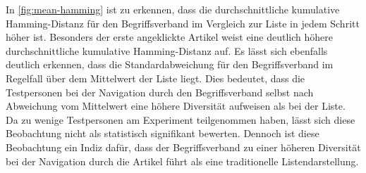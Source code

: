 In \autoref{fig:mean-hamming} ist zu erkennen, dass die durchschnittliche kumulative Hamming-Distanz für den Begriffsverband im Vergleich zur Liste in jedem Schritt höher ist.
Besonders der erste angeklickte Artikel weist eine deutlich höhere durchschnittliche kumulative Hamming-Distanz auf.
Es lässt sich ebenfalls deutlich erkennen, dass die Standardabweichung für den Begriffsverband im Regelfall über dem Mittelwert der Liste liegt.
Dies bedeutet, dass die Testpersonen bei der Navigation durch den Begriffsverband selbst nach Abweichung vom Mittelwert eine höhere Diversität aufweisen als bei der Liste.
Da zu wenige Testpersonen am Experiment teilgenommen haben, lässt sich diese Beobachtung nicht als statistisch signifikant bewerten.
Dennoch ist diese Beobachtung ein Indiz dafür, dass der Begriffsverband zu einer höheren Diversität bei der Navigation durch die Artikel führt als eine traditionelle Listendarstellung.
